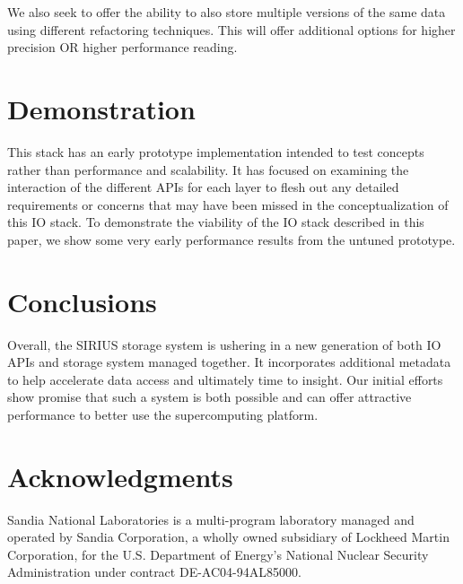 \documentclass[letterpaper,twocolumn,10pt]{article}
\begin{document}
We also seek to offer the ability to also store multiple versions of the same
data using different refactoring techniques. This will offer additional options
for higher precision OR higher performance reading.

\section{Demonstration}
\label{sec:evaluation}

This stack has an early prototype implementation intended to test concepts
rather than performance and scalability. It has focused on examining the
interaction of the different APIs for each layer to flesh out any detailed
requirements or concerns that may have been missed in the conceptualization of
this IO stack. To demonstrate the viability of the IO stack described in this
paper, we show some very early performance results from the untuned prototype.

\section{Conclusions}
\label{sec:conclusion}

Overall, the SIRIUS storage system is ushering in a new generation of both IO
APIs and storage system managed together. It incorporates additional metadata
to help accelerate data access and ultimately time to insight. Our initial
efforts show promise that such a system is both possible and can offer
attractive performance to better use the supercomputing platform.

%
%

\section{Acknowledgments}

Sandia National Laboratories is a multi-program laboratory managed and operated
by Sandia Corporation, a wholly owned subsidiary of Lockheed Martin
Corporation, for the U.S. Department of Energy's National Nuclear Security
Administration under contract DE-AC04-94AL85000.

{\footnotesize 
}

\end{document}
